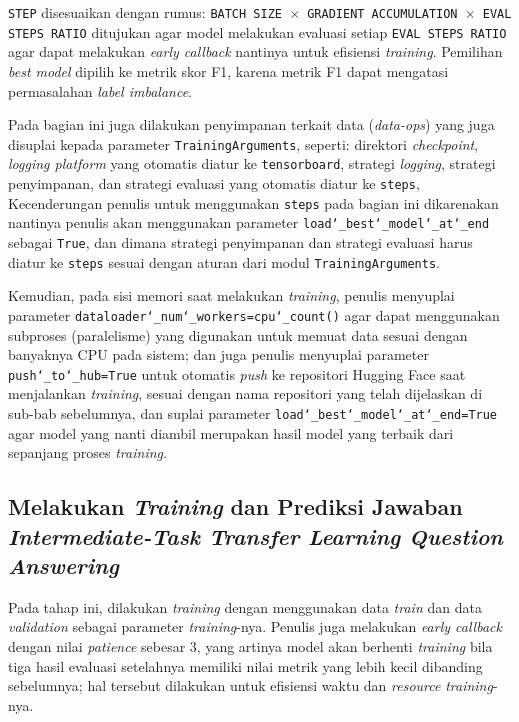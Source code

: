 \texttt{STEP} disesuaikan dengan rumus: \texttt{BATCH SIZE $\times$ GRADIENT ACCUMULATION $\times$ EVAL STEPS RATIO} ditujukan agar model melakukan evaluasi setiap \texttt{EVAL STEPS RATIO} agar dapat melakukan \emph{early callback} nantinya untuk efisiensi \emph{training}. Pemilihan \emph{best model} dipilih ke metrik skor F1, karena metrik F1 dapat mengatasi permasalahan \emph{label imbalance}.

Pada bagian ini juga dilakukan penyimpanan terkait data (\emph{data-ops}) yang juga disuplai kepada parameter \texttt{TrainingArguments}, seperti: direktori \emph{checkpoint}, \emph{logging platform} yang otomatis diatur ke \texttt{tensorboard}, strategi \emph{logging}, strategi penyimpanan, dan strategi evaluasi yang otomatis diatur ke \texttt{steps}, Kecenderungan penulis untuk menggunakan \texttt{steps} pada bagian ini dikarenakan nantinya penulis akan menggunakan parameter \texttt{load\char`_best\char`_model\char`_at\char`_end} sebagai \texttt{True}, dan dimana strategi penyimpanan dan strategi evaluasi harus diatur ke \texttt{steps} sesuai dengan aturan dari modul \texttt{TrainingArguments}.

Kemudian, pada sisi memori saat melakukan \emph{training}, penulis menyuplai parameter \texttt{dataloader\char`_num\char`_workers=cpu\char`_count()} agar dapat menggunakan subproses (paralelisme) yang digunakan untuk memuat data sesuai dengan banyaknya CPU pada sistem; dan juga penulis menyuplai parameter \texttt{push\char`_to\char`_hub=True} untuk otomatis \emph{push} ke repositori Hugging Face saat menjalankan \emph{training}, sesuai dengan nama repositori yang telah dijelaskan di sub-bab sebelumnya, dan suplai parameter \texttt{load\char`_best\char`_model\char`_at\char`_end=True} agar model yang nanti diambil merupakan hasil model yang terbaik dari sepanjang proses \emph{training}.

\subsection{Melakukan \emph{Training} dan Prediksi Jawaban \emph{Intermediate-Task Transfer Learning Question Answering}}
Pada tahap ini, dilakukan \emph{training} dengan menggunakan data \emph{train} dan data \emph{validation} sebagai parameter \emph{training}-nya. Penulis juga melakukan \emph{early callback} dengan nilai \emph{patience} sebesar 3, yang artinya model akan berhenti \emph{training} bila tiga hasil evaluasi setelahnya memiliki nilai metrik yang lebih kecil dibanding sebelumnya; hal tersebut dilakukan untuk efisiensi waktu dan \emph{resource} \emph{training}-nya. 

